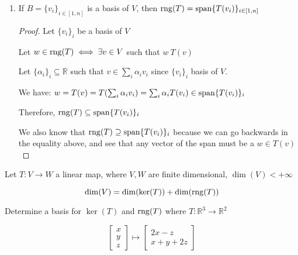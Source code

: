 \begin{remark}
\begin{enumerate}
		\item If $B = \{v_i\}_{i \in [1,n]}$ is a basis of $V$, then $\mathrm{rng}(T) = \mathrm{span}\{T(v_i)\}_{i \in [1,n]}$
		
		\begin{proof}
			Let $\{v_i\}_i$ be a basis of $V$

			Let $w \in \mathrm{rng}(T) \iff \exists v \in V$ such that $w \ T(v)$

			Let $\{\alpha_i\}_i \subseteq \mathbb{R}$ such that $v \in \sum_i \alpha_i v_i$ since $\{v_i\}_i$ basis of $V$.

			We have: $w = T(v) = T(\sum_i \alpha_i v_i) = \sum_i \alpha_i T(v_i) \in \mathrm{span}\{T(v_i)\}_i$

			Therefore, $\mathrm{rng}(T) \subseteq \mathrm{span}\{T(v_i)\}_i$

			We also know that $\mathrm{rng}(T) \supseteq \mathrm{span}\{T(v_i)\}_i$ because we can go backwards in the equality above, and see that any vector of the span must be a $w \in T(v)$ 
		\end{proof}
	\end{enumerate}
\end{remark}

\begin{theorem}
	Let $T:V \to W$ a linear map, where $V,W$ are finite dimensional, $\dim(V) < +\infty$

	\[\dim(V) = \dim(\ker(T)) + \dim(\mathrm{rng}(T))\]
\end{theorem}

\begin{example}
	Determine a basis for $\ker(T)$ and $\mathrm{rng}(T)$ where $T:\mathbb{R}^3 \to \mathbb{R}^2$

	\[\begin{bmatrix}
		x\\y\\z
	\end{bmatrix} \mapsto \begin{bmatrix}
		2x - z\\x+y+2z
	\end{bmatrix}\]
\end{example}

